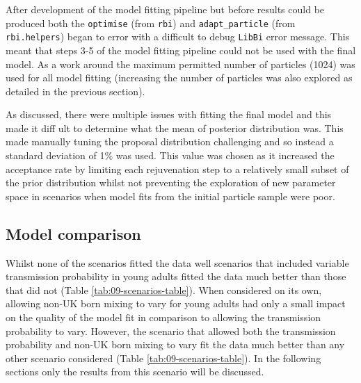 \documentclass[11pt,twoside]{bristolthesis}
\begin{document}
  After development of the model fitting pipeline but before results could be produced both the \texttt{optimise} (from \texttt{rbi}) and \texttt{adapt\_particle} (from \texttt{rbi.helpers}) began to error with a difficult to debug \texttt{LibBi} error message. This meant that steps 3-5 of the model fitting pipeline could not be used with the final model. As a work around the maximum permitted number of particles (1024) was used for all model fitting (increasing the number of particles was also explored as detailed in the previous section).
  
  As discussed, there were multiple issues with fitting the final model and this made it diff ult to determine what the mean of posterior distribution was. This made manually tuning the proposal distribution challenging and so instead a standard deviation of 1\% was used. This value was chosen as it increased the acceptance rate by limiting each rejuvenation step to a relatively small subset of the prior distribution whilst not preventing the exploration of new parameter space in scenarios when model fits from the initial particle sample were poor.
  
  \hypertarget{model-comparison-1}{%
  \subsection{Model comparison}\label{model-comparison-1}}
  
  Whilst none of the scenarios fitted the data well scenarios that included variable transmission probability in young adults fitted the data much better than those that did not (Table \ref{tab:09-scenarios-table}). When considered on its own, allowing non-UK born mixing to vary for young adults had only a small impact on the quality of the model fit in comparison to allowing the transmission probability to vary. However, the scenario that allowed both the transmission probability and non-UK born mixing to vary fit the data much better than any other scenario considered (Table \ref{tab:09-scenarios-table}). In the following sections only the results from this scenario will be discussed.
  
\end{document}
